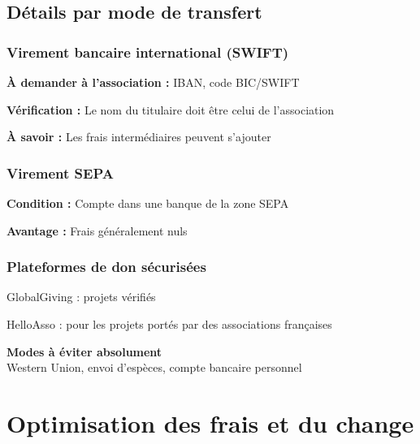\documentclass[12pt, a4paper]{article}
\begin{document}
\subsection{Détails par mode de transfert}

\subsubsection{Virement bancaire international (SWIFT)}
\begin{arrowlist}
    \item \textbf{À demander à l'association :} IBAN, code BIC/SWIFT
    \item \textbf{Vérification :} Le nom du titulaire doit être celui de l'association
    \item \textbf{À savoir :} Les frais intermédiaires peuvent s'ajouter
\end{arrowlist}

\subsubsection{Virement SEPA}
\begin{arrowlist}
    \item \textbf{Condition :} Compte dans une banque de la zone SEPA
    \item \textbf{Avantage :} Frais généralement nuls
\end{arrowlist}

\subsubsection{Plateformes de don sécurisées}
\begin{arrowlist}
    \item GlobalGiving : projets vérifiés
    \item HelloAsso : pour les projets portés par des associations françaises
\end{arrowlist}

\begin{alertbox}
    \centering
    \textbf{Modes à éviter absolument} \\
    \vspace{0.2cm}
    Western Union, envoi d'espèces, compte bancaire personnel
\end{alertbox}

\newpage

\section{Optimisation des frais et du change}
\end{document}

